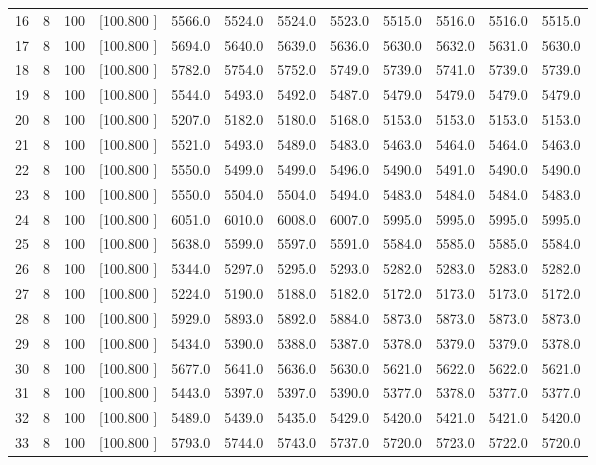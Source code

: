\documentclass[12pt,a4paper]{article}
\begin{document}
\begin{center}
{\begin{tabular}{r r r r r r r r r r r r}
  16&  8&100&[100.800   ]&  5566.0&  5524.0&  5524.0&  5523.0&  5515.0&  5516.0&  5516.0&  5515.0\\[-0.02in]
  17&  8&100&[100.800   ]&  5694.0&  5640.0&  5639.0&  5636.0&  5630.0&  5632.0&  5631.0&  5630.0\\[-0.02in]
  18&  8&100&[100.800   ]&  5782.0&  5754.0&  5752.0&  5749.0&  5739.0&  5741.0&  5739.0&  5739.0\\[-0.02in]
  19&  8&100&[100.800   ]&  5544.0&  5493.0&  5492.0&  5487.0&  5479.0&  5479.0&  5479.0&  5479.0\\[-0.02in]
  20&  8&100&[100.800   ]&  5207.0&  5182.0&  5180.0&  5168.0&  5153.0&  5153.0&  5153.0&  5153.0\\[-0.02in]
  21&  8&100&[100.800   ]&  5521.0&  5493.0&  5489.0&  5483.0&  5463.0&  5464.0&  5464.0&  5463.0\\[-0.02in]
  22&  8&100&[100.800   ]&  5550.0&  5499.0&  5499.0&  5496.0&  5490.0&  5491.0&  5490.0&  5490.0\\[-0.02in]
  23&  8&100&[100.800   ]&  5550.0&  5504.0&  5504.0&  5494.0&  5483.0&  5484.0&  5484.0&  5483.0\\[-0.02in]
  24&  8&100&[100.800   ]&  6051.0&  6010.0&  6008.0&  6007.0&  5995.0&  5995.0&  5995.0&  5995.0\\[-0.02in]
  25&  8&100&[100.800   ]&  5638.0&  5599.0&  5597.0&  5591.0&  5584.0&  5585.0&  5585.0&  5584.0\\[-0.02in]
  26&  8&100&[100.800   ]&  5344.0&  5297.0&  5295.0&  5293.0&  5282.0&  5283.0&  5283.0&  5282.0\\[-0.02in]
  27&  8&100&[100.800   ]&  5224.0&  5190.0&  5188.0&  5182.0&  5172.0&  5173.0&  5173.0&  5172.0\\[-0.02in]
  28&  8&100&[100.800   ]&  5929.0&  5893.0&  5892.0&  5884.0&  5873.0&  5873.0&  5873.0&  5873.0\\[-0.02in]
  29&  8&100&[100.800   ]&  5434.0&  5390.0&  5388.0&  5387.0&  5378.0&  5379.0&  5379.0&  5378.0\\[-0.02in]
  30&  8&100&[100.800   ]&  5677.0&  5641.0&  5636.0&  5630.0&  5621.0&  5622.0&  5622.0&  5621.0\\[-0.02in]
  31&  8&100&[100.800   ]&  5443.0&  5397.0&  5397.0&  5390.0&  5377.0&  5378.0&  5377.0&  5377.0\\[-0.02in]
  32&  8&100&[100.800   ]&  5489.0&  5439.0&  5435.0&  5429.0&  5420.0&  5421.0&  5421.0&  5420.0\\[-0.02in]
  33&  8&100&[100.800   ]&  5793.0&  5744.0&  5743.0&  5737.0&  5720.0&  5723.0&  5722.0&  5720.0\\[-0.02in]

\end{tabular}}
\end{center}
\end{document}
